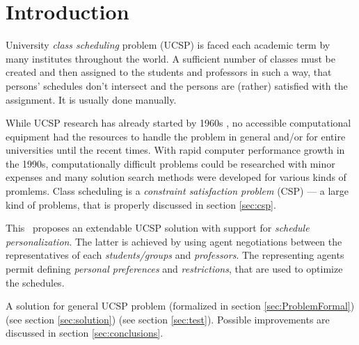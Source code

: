 \documentclass[ThesisDoc]{subfiles}
\begin{document}
\section{Introduction}

University \emph{class scheduling} problem (UCSP) is faced each academic term
by many institutes throughout the world. A sufficient number of classes must
be created and then assigned to the students and professors in such a way,
that persons' schedules don't intersect and the persons are (rather) satisfied
with the assignment. It is usually done manually.

While UCSP research has already started by 1960s ,
no accessible computational equipment had the resources to handle the problem
in general and/or for entire universities until the recent times.
With rapid computer performance growth in the 1990s, computationally
difficult problems could be researched with minor expenses and many
solution search methods were developed for various kinds of promlems.
Class scheduling is a \emph{constraint satisfaction problem} (CSP) ---
a large kind of problems, that is properly discussed in section \ref{sec:csp}.


\medskip

\noindent
This \thisdoc\ proposes an extendable UCSP solution with support for
\emph{schedule personalization}. The latter is achieved by using agent
negotiations between the representatives of each \emph{students/groups} and
\emph{professors}. The representing agents permit defining
\emph{personal preferences} and \emph{restrictions}, that are used to optimize
the schedules.

\medskip

\noindent
A solution for general UCSP problem
(formalized in section \ref{sec:ProblemFormal}) 
(see section \ref{sec:solution})  (see section \ref{sec:test}).
Possible improvements are discussed in section \ref{sec:conclusions}.
\end{document}
